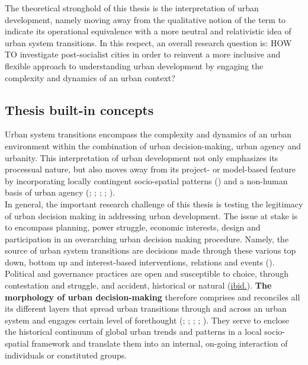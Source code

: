 \documentclass[11pt]{report}
\begin{document}
{{The theoretical stronghold of this thesis is the interpretation  of  urban  development,  namely  moving  away  from the qualitative  notion of the term to indicate  its  operational  equivalence  with  a more  neutral  and  relativistic idea of urban system transitions.
In this respect, an overall research question is: HOW TO investigate  post-socialist cities in order to reinvent a more inclusive and flexible approach to understanding urban development by engaging the complexity and dynamics of an urban context?

\subsection{Thesis built-in concepts}

Urban system transitions encompass the complexity and dynamics of an urban environment within the combination of urban decision-making, urban agency and urbanity.
This interpretation of urban development not only emphasizes its processual nature, but also moves away from its project- or model-based feature by incorporating locally contingent socio-spatial patterns (\href{ref}{\citealt{guy_understanding_2000}}) and a non-human basis of urban agency (\href{ref}{\citealt{healey_planners_1992}}; \citealt{mcfarlane_assemblage_2011}; \citealt{anderson_assemblage_2011};
\cite{healey_circuits_2013}; \citealt{rafiee_relationship_2014}).
\\

In general, the important research challenge of this thesis is testing the legitimacy of urban decision making in addressing urban development. The issue at stake is to encompass planning, power struggle, economic interests, design and participation in an overarching urban decision making procedure. Namely, the source of urban system transitions are decisions made through these various top down, bottom up and interest-based interventions, relations and events (\citealt{hudson_political_2014}).
Political and governance practices are open and susceptible to choice, through contestation and struggle, and accident, historical or natural (\href{ref}{ibid.}).
\textbf{The morphology of urban decision-making} therefore comprises and reconciles all its different layers that spread urban transitions through and across an urban system and engages certain level of forethought ({\citealt{healey_collaborative_1997}}; \href{ref}{\citealt{scott_seeing_1998}}; \href{ref}{\citealt{pierre_debating_2000}}; \href{ref}{\citealt{pierre_governance_2000}}; \href{ref}{\citealt{hudson_political_2014}}). They serve to enclose the historical continuum of global urban trends and patterns in a local socio-spatial framework and translate them into an internal, on-going interaction of individuals or constituted groups.
\\

}}
\end{document}
